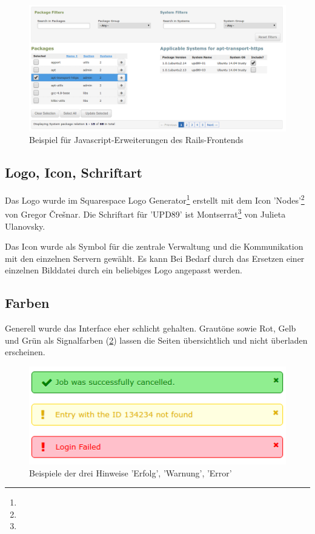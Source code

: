 \begin{figure}[H]
	\centering
	\includegraphics[width=\linewidth]{files/combo_view}
	\caption{Beispiel für Javascript-Erweiterungen des Rails-Frontends}
	\label{fig:design:js_example}
\end{figure}

\subsection*{Logo, Icon, Schriftart}

Das Logo wurde im Squarespace Logo Generator\footnote{} erstellt mit dem Icon 'Nodes'\footnote{} von Gregor Črešnar. Die Schriftart für 'UPD89' ist Montserrat\footnote{} von Julieta Ulanovsky.

Das Icon wurde als Symbol für die zentrale Verwaltung und die Kommunikation mit den einzelnen Servern gewählt. Es kann Bei Bedarf durch das Ersetzen einer einzelnen Bilddatei durch ein beliebiges Logo angepasst werden.

\subsection*{Farben}

Generell wurde das Interface eher schlicht gehalten. Grautöne sowie Rot, Gelb und Grün als Signalfarben (\ref{fig:design:messages}) lassen die Seiten übersichtlich und nicht überladen erscheinen.

\begin{figure}[H]
	\centering
	\includegraphics[width=0.5\linewidth]{files/messages}
	\caption{Beispiele der drei Hinweise 'Erfolg', 'Warnung', 'Error'}
	\label{fig:design:messages}
\end{figure}


